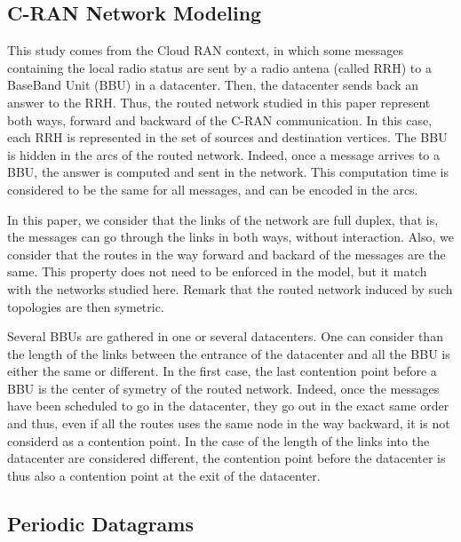 \documentclass[english]{article}
\begin{document}
  \subsection{C-RAN Network Modeling}
  \label{subsection:CRANGRAPH}
  This study comes from the Cloud RAN context, in which some messages containing the local radio status are sent by a radio antena (called RRH) to a BaseBand Unit (BBU) in a datacenter. Then, the datacenter sends back an answer to the RRH.
  Thus, the routed network studied in this paper represent both ways, forward and backward of the C-RAN communication. In this case, each RRH is represented in the set of sources and destination vertices. The BBU is hidden in the arcs of the routed network.
  Indeed, once a message arrives to a BBU, the answer is computed and sent in the network. This computation time is considered to be the same for all messages, and can be encoded in the arcs.
  
  In this paper, we consider that the links of the network are full duplex, that is, the messages can go through the links in both ways, without interaction. Also, we consider that the routes in the way forward and backard of the messages are the same. This property does not need to be enforced in the model, but it match with the networks studied here. Remark that the routed network induced by such topologies are then symetric.
  
    Several BBUs are gathered in one or several datacenters. One can consider than the length of the links between the entrance of the datacenter and all the BBU is either the same or different. In the first case, the last contention point before a BBU is the center of symetry of the routed network. Indeed, once the messages have been scheduled to go in the datacenter, they go out in the exact same order and thus, even if all the routes uses the same node in the way backward, it is not considerd as a contention point.
    In the case of the length of the links into the datacenter are considered different, the contention point before the datacenter is thus also a contention point at the exit of the datacenter. 

     
  \subsection{Periodic Datagrams}
\end{document}
